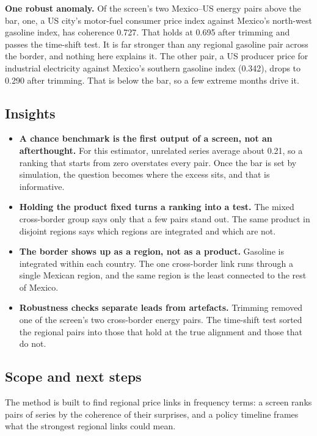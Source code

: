 \documentclass[
  british,
  a4paper,
]{article}
\providecommand{\tightlist}{%
  \setlength{\itemsep}{0pt}\setlength{\parskip}{0pt}}
\begin{document}
\textbf{One robust anomaly.} Of the screen's two Mexico--US energy pairs
above the bar, one, a US city's motor-fuel consumer price index against
Mexico's north-west gasoline index, has coherence 0.727. That holds at
0.695 after trimming and passes the time-shift test. It is far stronger
than any regional gasoline pair across the border, and nothing here
explains it. The other pair, a US producer price for industrial
electricity against Mexico's southern gasoline index (0.342), drops to
0.290 after trimming. That is below the bar, so a few extreme months
drive it.

\subsection{Insights}\label{insights}

\begin{itemize}
\tightlist
\item
  \textbf{A chance benchmark is the first output of a screen, not an
  afterthought.} For this estimator, unrelated series average about
  0.21, so a ranking that starts from zero overstates every pair. Once
  the bar is set by simulation, the question becomes where the excess
  sits, and that is informative.
\item
  \textbf{Holding the product fixed turns a ranking into a test.} The
  mixed cross-border group says only that a few pairs stand out. The
  same product in disjoint regions says which regions are integrated and
  which are not.
\item
  \textbf{The border shows up as a region, not as a product.} Gasoline
  is integrated within each country. The one cross-border link runs
  through a single Mexican region, and the same region is the least
  connected to the rest of Mexico.
\item
  \textbf{Robustness checks separate leads from artefacts.} Trimming
  removed one of the screen's two cross-border energy pairs. The
  time-shift test sorted the regional pairs into those that hold at the
  true alignment and those that do not.
\end{itemize}

\subsection{Scope and next steps}\label{scope-and-next-steps}

The method is built to find regional price links in frequency terms: a
screen ranks pairs of series by the coherence of their surprises, and a
policy timeline frames what the strongest regional links could mean.
\end{document}
